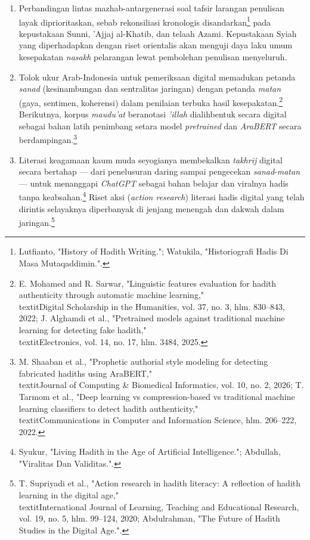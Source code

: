 \begin{enumerate}[leftmargin=1.27cm,itemsep=2pt,parsep=2pt]
\item Perbandingan lintas mazhab-antargenerasi soal tafsir larangan penulisan layak diprioritaskan, sebab rekonsiliasi kronologis disandarkan\footnote{Lutfianto, "History of Hadith Writing."; Watukila, "Historiografi Hadis Di Masa Mutaqaddimin.".} pada kepustakaan Sunni, 'Ajjaj al-Khatib, dan telaah Azami. Kepustakaan Syiah yang diperhadapkan dengan riset orientalis akan menguji daya laku umum kesepakatan \textit{nasakh} pelarangan lewat pembolehan penulisan menyeluruh.

\item Tolok ukur Arab-Indonesia untuk pemeriksaan digital memadukan petanda \textit{sanad} (kesinambungan dan sentralitas jaringan) dengan petanda \textit{matan} (gaya, sentimen, koherensi) dalam penilaian terbuka hasil kesepakatan.\footnote{E. Mohamed and R. Sarwar, "Linguistic features evaluation for hadith authenticity through automatic machine learning," \\textit{Digital Scholarship in the Humanities}, vol. 37, no. 3, hlm. 830--843, 2022; J. Alghamdi et al., "Pretrained models against traditional machine learning for detecting fake hadith," \\textit{Electronics}, vol. 14, no. 17, hlm. 3484, 2025.} Berikutnya, korpus \textit{maudu'at} beranotasi \textit{'illah} dialihbentuk secara digital sebagai bahan latih penimbang setara model \textit{pretrained} dan \textit{AraBERT} secara berdampingan.\footnote{M. Shaaban et al., "Prophetic authorial style modeling for detecting fabricated hadiths using AraBERT," \\textit{Journal of Computing & Biomedical Informatics}, vol. 10, no. 2, 2026; T. Tarmom et al., "Deep learning vs compression-based vs traditional machine learning classifiers to detect hadith authenticity," \\textit{Communications in Computer and Information Science}, hlm. 206--222, 2022.}

\item Literasi keagamaan kaum muda seyogianya membekalkan \textit{takhrij} digital secara bertahap --- dari penelusuran daring sampai pengecekan \textit{sanad}-\textit{matan} --- untuk menanggapi \textit{ChatGPT} sebagai bahan belajar dan viralnya hadis tanpa keabsahan.\footnote{Syukur, "Living Hadith in the Age of Artificial Intelligence."; Abdullah, "Viralitas Dan Validitas.".} Riset aksi (\textit{action research}) literasi hadis digital yang telah dirintis selayaknya diperbanyak di jenjang menengah dan dakwah dalam jaringan.\footnote{T. Supriyadi et al., "Action research in hadith literacy: A reflection of hadith learning in the digital age," \\textit{International Journal of Learning, Teaching and Educational Research}, vol. 19, no. 5, hlm. 99--124, 2020; Abdulrahman, "The Future of Hadith Studies in the Digital Age.".}


\end{enumerate}

